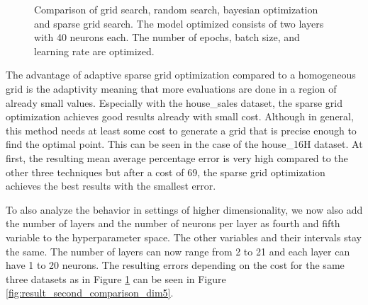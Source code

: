 \begin{figure}[htbp!]
	\caption{ Comparison of grid search, random search, bayesian optimization and sparse grid search. The model optimized consists of two layers with 40 neurons each. The number of epochs, batch size, and learning rate are optimized.  }	
	\label{fig:result_second_comparison_dim3}
\end{figure}


The advantage of adaptive sparse grid optimization compared to a homogeneous grid is the adaptivity meaning that more evaluations are done in a region of already small values. Especially with the house\_sales dataset, the sparse grid optimization achieves good results already with small cost. Although in general, this method needs at least some cost to generate a grid that is precise enough to find the optimal point. This can be seen in the case of the house\_16H dataset. At first, the resulting mean average percentage error is very high compared to the other three techniques but after a cost of 69, the sparse grid optimization achieves the best results with the smallest error. \newline 

To also analyze the behavior in settings of higher dimensionality, we now also add the number of layers and the number of neurons per layer as fourth and fifth variable to the hyperparameter space. The other variables and their intervals stay the same. The number of layers can now range from 2 to 21 and each layer can have 1 to 20 neurons. The resulting errors depending on the cost for the same three datasets as in Figure \ref{fig:result_second_comparison_dim3} can be seen in Figure \ref{fig:result_second_comparison_dim5}.


